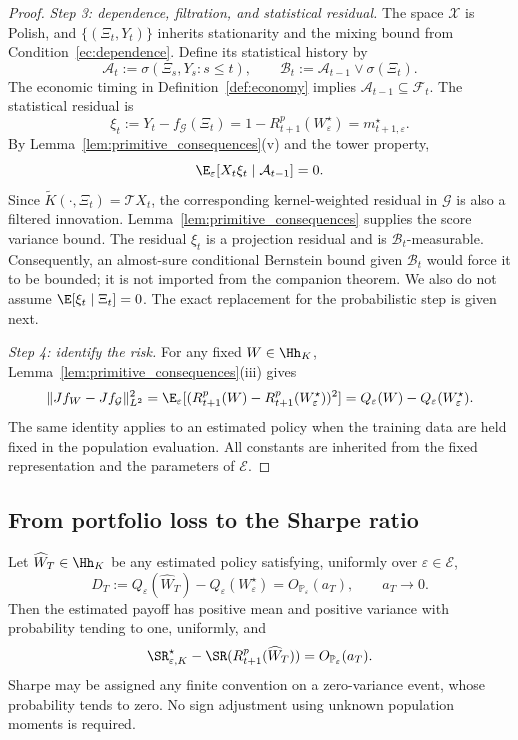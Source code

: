 \begin{proof}
\medskip
\noindent\textit{Step 3: dependence, filtration, and statistical residual.}
The space $\mathcal X$ is Polish, and
$\{(\Xi_t,Y_t)\}$ inherits stationarity and the mixing bound from
Condition~\ref{ec:dependence}. Define its statistical history by
\[
\mathcal A_t:=\sigma(\Xi_s,Y_s:s\leq t),
\qquad
\mathcal B_t:=\mathcal A_{t-1}\vee\sigma(\Xi_t).
\]
The economic timing in Definition~\ref{def:economy} implies
$\mathcal A_{t-1}\subseteq\mathscr F_t$.
The statistical residual is
\[
\xi_t:=Y_t-f_{\mathcal G}(\Xi_t)
=1-R^p_{t+1}(W^\star_\varepsilon)
=m^\star_{t+1,\varepsilon}.
\]
By Lemma~\ref{lem:primitive_consequences}(v) and the tower property,
\[
\E_\varepsilon[X_t\xi_t\mid\mathcal A_{t-1}]=0.
\]
Since $\widetilde K(\cdot,\Xi_t)=\mathcal TX_t$, the corresponding
kernel-weighted residual in $\mathcal G$ is also a filtered innovation.
Lemma~\ref{lem:primitive_consequences} supplies the score variance bound.
The residual $\xi_t$ is a projection residual and is $\mathcal B_t$-measurable.
Consequently, an almost-sure conditional Bernstein bound given $\mathcal B_t$
would force it to be bounded; it is not imported from the companion theorem.
We also do not assume $\E[\xi_t\mid\Xi_t]=0$. The exact replacement for the
probabilistic step is given next.

\medskip
\noindent\textit{Step 4: identify the risk.}
For any fixed $W\in\Hh_K$, Lemma~\ref{lem:primitive_consequences}(iii)
gives
\[
\|Jf_W-Jf_{\mathcal G}\|_{L^2}^2
=\E_\varepsilon[(R^p_{t+1}(W)-R^p_{t+1}(W^\star_\varepsilon))^2]
=Q_\varepsilon(W)-Q_\varepsilon(W^\star_\varepsilon).
\]
The same identity applies to an estimated policy when the training data
are held fixed in the population evaluation. All constants are inherited
from the fixed representation and the parameters of $\mathcal E$.
\end{proof}



\subsection{From portfolio loss to the Sharpe ratio}
\label{app:sharpe_recovery}

\begin{lemma}
\label{lem:sharpe_recovery}
Let $\widehat W_T\in\Hh_K$ be any estimated policy satisfying, uniformly over $\varepsilon\in\mathcal E$,
\[
D_T:=Q_\varepsilon(\widehat W_T)-Q_\varepsilon(W^\star_\varepsilon)
=O_{\mathbb P_\varepsilon}(a_T),
\qquad a_T\longrightarrow0.
\]
Then the estimated payoff has positive mean and positive variance with
probability tending to one, uniformly, and
\[
\SR^\star_{\varepsilon,K}
-\SR(R^p_{t+1}(\widehat W_T))
=O_{\mathbb P_\varepsilon}(a_T).
\]
Sharpe may be assigned any finite convention on a zero-variance event,
whose probability tends to zero. No sign adjustment using unknown
population moments is required.
\end{lemma}

